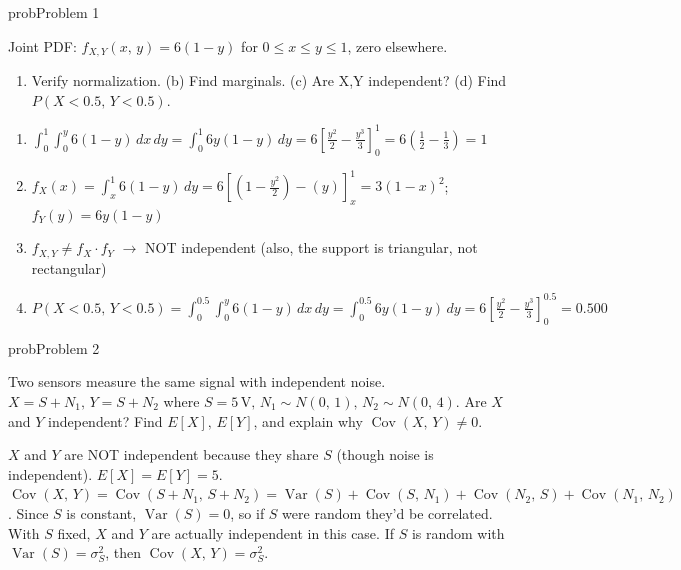 
\begin{PSbox}[unbreakable]{prob}{Problem 1}

Joint PDF: $f_{X,Y}(x,\,y) = 6(1-y)$ for $0 \le x \le y \le 1$, zero elsewhere.

\begin{enumerate}
\def\labelenumi{(\alph{enumi})}
\tightlist
\item
  Verify normalization. (b) Find marginals. (c) Are X,Y independent? (d) Find $P(X < 0.5,\, Y < 0.5)$.
\end{enumerate}

\PSsolution{} 

\begin{enumerate}
\def\labelenumi{(\alph{enumi})}
\tightlist
\item
  $\int_{0}^{1} \int_{0}^{y} 6(1-y)\,dx\,dy = \int_{0}^{1} 6y(1-y)\,dy = 6\left[\frac{y^{2}}{2} - \frac{y^{3}}{3}\right]_{0}^{1} = 6\left(\frac{1}{2} - \frac{1}{3}\right) = 1$ \PSyes{}
\item
  $f_{X}(x) = \int_{x}^{1} 6(1-y)\,dy = 6\left[\left(1-\frac{y^{2}}{2}\right) - (y)\right]_{x}^{1} = 3(1-x)^{2}$; $f_{Y}(y) = 6y(1-y)$
\item
  $f_{X,Y} \ne f_{X} \cdot f_{Y}$ \ensuremath{\to} NOT independent (also, the support is triangular, not rectangular)
\item
  $\displaystyle P(X < 0.5,\, Y < 0.5) = \int_{0}^{0.5} \int_{0}^{y} 6(1-y)\,dx\,dy = \int_{0}^{0.5} 6y(1-y)\,dy = 6\left[\frac{y^{2}}{2} - \frac{y^{3}}{3}\right]_{0}^{0.5} = 0.500$
\end{enumerate}

\end{PSbox}

\begin{PSbox}[unbreakable]{prob}{Problem 2}

Two sensors measure the same signal with independent noise. $X = S + N_{1},\, Y = S + N_{2}$ where $S = 5\,\mathrm{V},\, N_{1} \sim N(0,\,1),\, N_{2} \sim N(0,\,4)$. Are $X$ and $Y$ independent? Find $E[X],\, E[Y]$, and explain why $\operatorname{Cov}(X,\,Y) \ne 0$.

\PSsolution{} $X$ and $Y$ are NOT independent because they share $S$ (though noise is independent). $E[X] = E[Y] = 5$. $\operatorname{Cov}(X,\,Y) = \operatorname{Cov}(S+N_{1},\, S+N_{2}) = \operatorname{Var}(S) + \operatorname{Cov}(S,\,N_{1}) + \operatorname{Cov}(N_{2},\,S) + \operatorname{Cov}(N_{1},\,N_{2})$. Since $S$ is constant, $\operatorname{Var}(S) = 0$, so if $S$ were random they’d be correlated. With $S$ fixed, $X$ and $Y$ are actually independent in this case. If $S$ is random with $\operatorname{Var}(S) = \sigma_{S}^{2}$, then $\operatorname{Cov}(X,\,Y) = \sigma_{S}^{2}$.

\end{PSbox}

